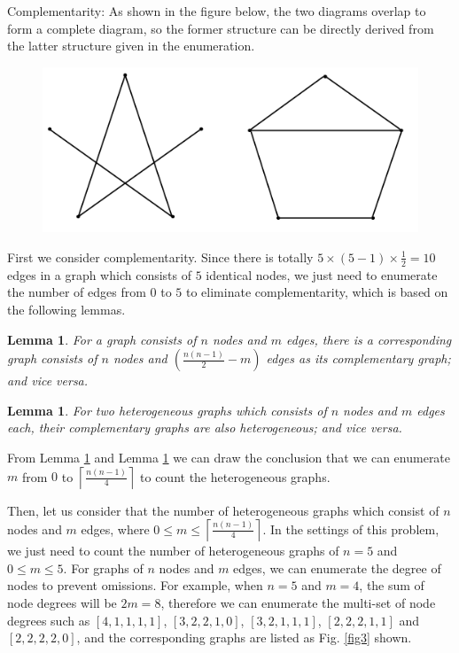 \documentclass{oxmathproblems}
\makeatletter
\newtheorem{lemma}[theorem]{Lemma}
\theoremstyle{definition}
\renewenvironment{solution}[1][Solution] {\par\pushQED{\qed}\normalfont\topsep6\p@\@plus6\p@\relax\trivlist\item[\hskip\labelsep\bfseries#1\@addpunct{.}]\ignorespaces}{\popQED\endtrivlist\@endpefalse} \makeatother
\makeatother
\begin{document}
Complementarity: As shown in the figure below, the two diagrams overlap to form a complete diagram, so the former structure can be directly derived from the latter structure given in the enumeration.
\begin{figure}[htbp]
	\centering
	\includegraphics[width=0.5\linewidth]{2.png}
	\label{fig2}
\end{figure}
\begin{solution}
	First we consider complementarity. Since there is totally $5\times (5 - 1) \times \frac{1}{2} = 10$ edges in a graph which consists of $5$ identical nodes, we just need to enumerate the number of edges from $0$ to $5$ to eliminate complementarity, which is based on the following lemmas.

	\begin{lemma}\label{lemma1} For a graph consists of $n$ nodes and $m$ edges, there is a corresponding graph consists of $n$ nodes and $\left(\frac{n(n-1)}{2} - m\right)$ edges as its complementary graph; and vice versa.
	\end{lemma}
	\begin{lemma}\label{lemma2} For two heterogeneous graphs which consists of $n$ nodes and $m$ edges each, their complementary graphs are also heterogeneous; and vice versa.
	\end{lemma}

	From Lemma \ref{lemma1} and Lemma \ref{lemma2} we can draw the conclusion that we can enumerate $m$ from $0$ to $\left\lceil\frac{n(n-1)}{4}\right\rceil$ to count the heterogeneous graphs.

	Then, let us consider that the number of heterogeneous graphs which consist of $n$ nodes and $m$ edges, where $0 \leq m \leq \left\lceil\frac{n(n-1)}{4}\right\rceil$. In the settings of this problem, we just need to count the number of heterogeneous graphs of $n = 5$ and $0 \leq m \leq 5$. For graphs of $n$ nodes and $m$ edges, we can enumerate the degree of nodes to prevent omissions. For example, when $n = 5$ and $m = 4$, the sum of node degrees will be $2m = 8$, therefore we can enumerate the multi-set of node degrees such as $[4, 1, 1, 1, 1]$, $[3, 2, 2, 1, 0]$, $[3, 2, 1, 1, 1]$, $[2, 2, 2, 1, 1]$ and $[2, 2, 2, 2, 0]$, and the corresponding graphs are listed as Fig. \ref{fig3} shown.


\end{solution}
\end{document}
